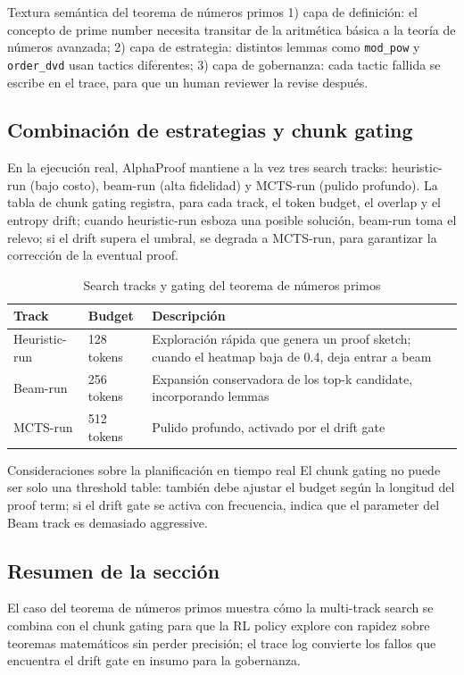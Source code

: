 \documentclass[a4paper]{article}
\begin{document}
\begin{knowledgebox}{Textura semántica del teorema de números primos}
1) capa de definición: el concepto de prime number necesita transitar de la aritmética básica a la teoría de números avanzada; 2) capa de estrategia: distintos lemmas como \texttt{mod\_pow} y \texttt{order\_dvd} usan tactics diferentes; 3) capa de gobernanza: cada tactic fallida se escribe en el trace, para que un human reviewer la revise después.
\end{knowledgebox}

\subsection{Combinación de estrategias y chunk gating}
En la ejecución real, AlphaProof mantiene a la vez tres search tracks: heuristic-run (bajo costo), beam-run (alta fidelidad) y MCTS-run (pulido profundo). La tabla de chunk gating registra, para cada track, el token budget, el overlap y el entropy drift; cuando heuristic-run esboza una posible solución, beam-run toma el relevo; si el drift supera el umbral, se degrada a MCTS-run, para garantizar la corrección de la eventual proof.

\begin{table}[H]
\centering
\begin{tabular}{p{3.5cm}p{3.5cm}p{5cm}}
\toprule
Track & Budget & Descripción \\
\midrule
Heuristic-run & 128 tokens & Exploración rápida que genera un proof sketch; cuando el heatmap baja de 0.4, deja entrar a beam \\
Beam-run & 256 tokens & Expansión conservadora de los top-k candidate, incorporando lemmas \\
MCTS-run & 512 tokens & Pulido profundo, activado por el drift gate \\
\bottomrule
\end{tabular}
\caption{Search tracks y gating del teorema de números primos}
\end{table}

\begin{warningbox}{Consideraciones sobre la planificación en tiempo real}
El chunk gating no puede ser solo una threshold table: también debe ajustar el budget según la longitud del proof term; si el drift gate se activa con frecuencia, indica que el parameter del Beam track es demasiado aggressive.
\end{warningbox}

\subsection{Resumen de la sección}
El caso del teorema de números primos muestra cómo la multi-track search se combina con el chunk gating para que la RL policy explore con rapidez sobre teoremas matemáticos sin perder precisión; el trace log convierte los fallos que encuentra el drift gate en insumo para la gobernanza.
\newpage
\end{document}

